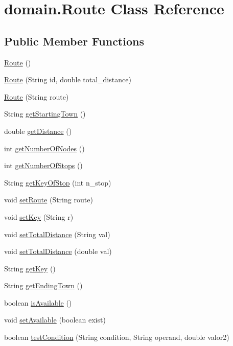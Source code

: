 \hypertarget{classdomain_1_1_route}{}\section{domain.\+Route Class Reference}
\label{classdomain_1_1_route}
\subsection*{Public Member Functions}
\begin{DoxyCompactItemize}
\item 
\hyperlink{classdomain_1_1_route_a7e62f0d946cbba216309d1c603346578}{Route} ()
\item 
\hyperlink{classdomain_1_1_route_a18a40dd809d38f62057c29212b3e2e76}{Route} (String id, double total\+\_\+distance)
\item 
\hyperlink{classdomain_1_1_route_a22e34515792c628b7a3953744054d5fe}{Route} (String route)
\item 
String \hyperlink{classdomain_1_1_route_a63676b06b623621dbde9a06126bf4b5c}{get\+Starting\+Town} ()
\item 
double \hyperlink{classdomain_1_1_route_a39e1f65aa6930a75d8b8edb73fb06f02}{get\+Distance} ()
\item 
int \hyperlink{classdomain_1_1_route_a26f7bfa398e907882925e09b197dabec}{get\+Number\+Of\+Nodes} ()
\item 
int \hyperlink{classdomain_1_1_route_a863264da3af911c200d94f53733e07b4}{get\+Number\+Of\+Stops} ()
\item 
String \hyperlink{classdomain_1_1_route_aec22d9627aa0a3afd7bf20a61a0f4695}{get\+Key\+Of\+Stop} (int n\+\_\+stop)
\item 
void \hyperlink{classdomain_1_1_route_ac152ebbec9a46aee30cdd98c3a35a6d5}{set\+Route} (String route)
\item 
void \hyperlink{classdomain_1_1_route_a3b472fbb44362997723edf02014bc77f}{set\+Key} (String r)
\item 
void \hyperlink{classdomain_1_1_route_a33d5c5c64f0fdb4a0317ec0019bedc5a}{set\+Total\+Distance} (String val)
\item 
void \hyperlink{classdomain_1_1_route_a263bcca7d34766e0ba9ed86651c5a212}{set\+Total\+Distance} (double val)
\item 
String \hyperlink{classdomain_1_1_route_a5a9ed7d2692549002ab7ae59a3b5b5d9}{get\+Key} ()
\item 
String \hyperlink{classdomain_1_1_route_a914f727c54adab3aa1a62f61c997dcdd}{get\+Ending\+Town} ()
\item 
boolean \hyperlink{classdomain_1_1_route_addbf041cdbb4a24ff5f0b2a6fbce4c7d}{is\+Available} ()
\item 
void \hyperlink{classdomain_1_1_route_a55e0dd8f63814b1708275082f4ba5fc4}{set\+Available} (boolean exist)
\item 
boolean \hyperlink{classdomain_1_1_route_aa130fcfb95d38f93081a7f30438fb1e9}{test\+Condition} (String condition, String operand, double valor2)
\end{DoxyCompactItemize}
